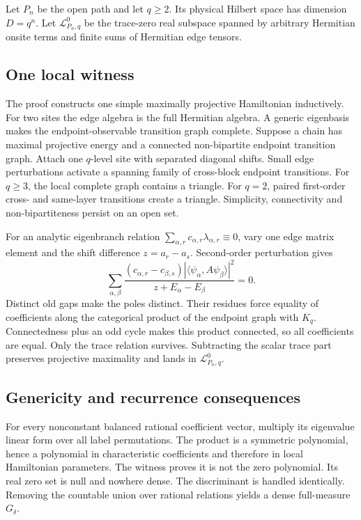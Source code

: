 Let $P_n$ be the open path and let $q\ge2$.  Its physical Hilbert space
has dimension $D=q^n$.  Let $\mathcal L_{P_n,q}^0$ be the trace-zero real
subspace spanned by arbitrary Hermitian onsite terms and finite sums of
Hermitian edge tensors.

\subsection{One local witness}

The proof constructs one simple maximally projective Hamiltonian inductively.
For two sites the edge algebra is the full Hermitian algebra.  A generic
eigenbasis makes the endpoint-observable transition graph complete.  Suppose
a chain has maximal projective energy and a connected non-bipartite endpoint
transition graph.  Attach one $q$-level site with separated diagonal
shifts.  Small edge perturbations activate a spanning family of cross-block
endpoint transitions.  For $q\ge3$, the local complete graph contains a
triangle.  For $q=2$, paired first-order cross- and same-layer transitions
create a triangle.  Simplicity, connectivity and non-bipartiteness persist
on an open set.

For an analytic eigenbranch relation
$\sum_{\alpha,r}c_{\alpha,r}\lambda_{\alpha,r}\equiv0$, vary one edge
matrix element and the shift difference $z=a_r-a_s$.  Second-order
perturbation gives
\[
 \sum_{\alpha,\beta}
 \frac{(c_{\alpha,r}-c_{\beta,s})
 |\langle\psi_\alpha,A\psi_\beta\rangle|^2}
 {z+E_\alpha-E_\beta}=0.
\]
Distinct old gaps make the poles distinct.  Their residues force equality
of coefficients along the categorical product of the endpoint graph with
$K_q$.  Connectedness plus an odd cycle makes this product connected, so
all coefficients are equal.  Only the trace relation survives.  Subtracting
the scalar trace part preserves projective maximality and lands in
$\mathcal L_{P_n,q}^0$.

\subsection{Genericity and recurrence consequences}

For every nonconstant balanced rational coefficient vector, multiply its
eigenvalue linear form over all label permutations.  The product is a
symmetric polynomial, hence a polynomial in characteristic coefficients and
therefore in local Hamiltonian parameters.  The witness proves it is not the
zero polynomial.  Its real zero set is null and nowhere dense.  The
discriminant is handled identically.  Removing the countable union over
rational relations yields a dense full-measure $G_\delta$.

